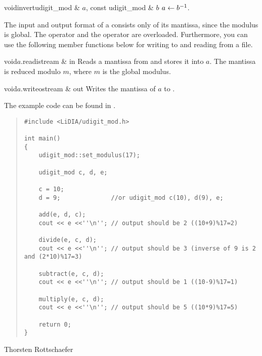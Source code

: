 \begin{fcode}{void}{invert}{udigit_mod & $a$, const udigit_mod & $b$}
  $a \leftarrow b^{-1}$.
\end{fcode}



\IO

The input and output format of a  consists only of its mantissa, since the
modulus is global.  The  operator \code{>>} and the  operator
\code{<<} are overloaded.  Furthermore, you can use the following member functions below for
writing to and reading from a file.

\begin{fcode}{void}{$a$.read}{istream & in}
  Reads a mantissa from  and stores it into $a$.  The mantissa is reduced modulo $m$,
  where $m$ is the global modulus.
\end{fcode}

\begin{cfcode}{void}{$a$.write}{ostream & out}
  Writes the mantissa of $a$ to .
\end{cfcode}



\SEEALSO




\NOTES

The example code can be found in .



\EXAMPLES

\begin{quote}
\begin{verbatim}
#include <LiDIA/udigit_mod.h>

int main()
{
    udigit_mod::set_modulus(17);

    udigit_mod c, d, e;

    c = 10;
    d = 9;              //or udigit_mod c(10), d(9), e;

    add(e, d, c);
    cout << e <<''\n''; // output should be 2 ((10+9)%17=2)

    divide(e, c, d);
    cout << e <<''\n''; // output should be 3 (inverse of 9 is 2 and (2*10)%17=3)

    subtract(e, c, d);
    cout << e <<''\n''; // output should be 1 ((10-9)%17=1)

    multiply(e, c, d);
    cout << e <<''\n''; // output should be 5 ((10*9)%17=5)

    return 0;
}
\end{verbatim}
\end{quote}



\AUTHOR

Thorsten Rottschaefer
